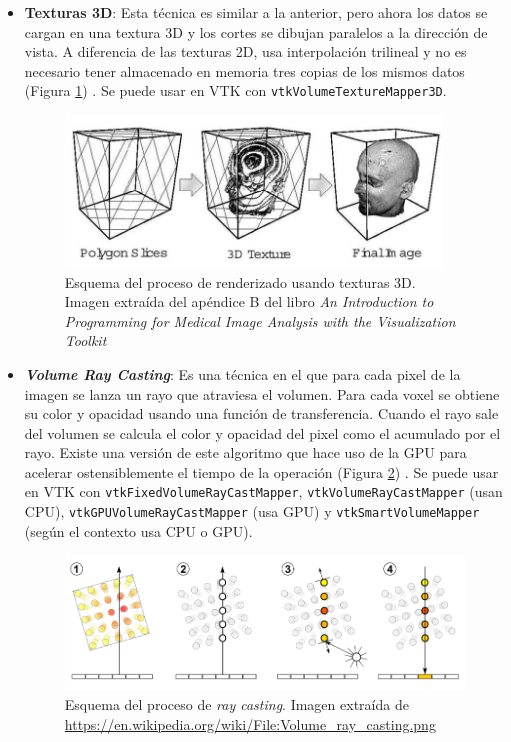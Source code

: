 \begin{itemize}
	\item \textbf{Texturas 3D}: Esta técnica es similar a la anterior, pero ahora los datos se cargan en una textura 3D y los cortes se dibujan paralelos a la dirección de vista. A diferencia de las texturas 2D, usa interpolación trilineal y no es necesario tener almacenado en memoria tres copias de los mismos datos (Figura \ref{fig:texturas3d}) \cite{intro_medical_vtk_bioimage}. Se puede usar en VTK con \texttt{vtkVolumeTextureMapper3D}.
	\begin{figure}[H]
		\centering
		\includegraphics[width=10cm]{imagenes/texturas3d}
		\caption{Esquema del proceso de renderizado usando texturas 3D. Imagen extraída del apéndice B del libro \textit{An Introduction to Programming for Medical Image Analysis with the Visualization Toolkit} \cite{intro_medical_vtk_bioimage}}
		\label{fig:texturas3d}
	\end{figure}
	
	\item \textbf{\textit{Volume Ray Casting}}: Es una técnica en el que para cada pixel de la imagen se lanza un rayo que atraviesa el volumen. Para cada voxel se obtiene su color y opacidad usando una función de transferencia. Cuando el rayo sale del volumen se calcula el color y opacidad del pixel como el acumulado por el rayo. Existe una versión de este algoritmo que hace uso de la GPU para acelerar ostensiblemente el tiempo de la operación (Figura \ref{fig:volume_ray_casting}) \cite{intro_medical_vtk_bioimage}. Se puede usar en VTK con \texttt{vtkFixedVolumeRayCastMapper}, \texttt{vtkVolumeRayCastMapper} (usan CPU), \texttt{vtkGPUVolumeRayCastMapper} (usa GPU) y \texttt{vtkSmartVolumeMapper} (según el contexto usa CPU o GPU).
	\begin{figure}[H]
		\centering
		\includegraphics[width=12.5cm]{imagenes/volume_ray_casting}
		\caption{Esquema del proceso de \textit{ray casting}. Imagen extraída de \url{https://en.wikipedia.org/wiki/File:Volume_ray_casting.png}}
		\label{fig:volume_ray_casting}
	\end{figure}
\end{itemize}

